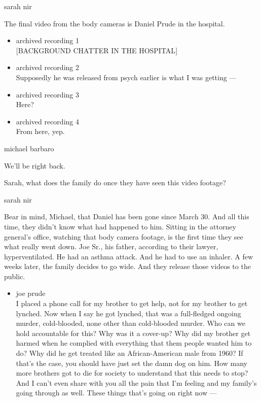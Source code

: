sarah nir

The final video from the body cameras is Daniel Prude in the hospital.

\begin{itemize}
\item
  archived recording 1\\
  {[}BACKGROUND CHATTER IN THE HOSPITAL{]}
\item
  archived recording 2\\
  Supposedly he was released from psych earlier is what I was getting
  ---
\item
  archived recording 3\\
  Here?
\item
  archived recording 4\\
  From here, yep.
\end{itemize}

michael barbaro

We'll be right back.

Sarah, what does the family do once they have seen this video footage?

sarah nir

Bear in mind, Michael, that Daniel has been gone since March 30. And all
this time, they didn't know what had happened to him. Sitting in the
attorney general's office, watching that body camera footage, is the
first time they see what really went down. Joe Sr., his father,
according to their lawyer, hyperventilated. He had an asthma attack. And
he had to use an inhaler. A few weeks later, the family decides to go
wide. And they release those videos to the public.

\begin{itemize}
\tightlist
\item
  joe prude\\
  I placed a phone call for my brother to get help, not for my brother
  to get lynched. Now when I say he got lynched, that was a full-fledged
  ongoing murder, cold-blooded, none other than cold-blooded murder. Who
  can we hold accountable for this? Why was it a cover-up? Why did my
  brother get harmed when he complied with everything that them people
  wanted him to do? Why did he get treated like an African-American male
  from 1960? If that's the case, you should have just set the damn dog
  on him. How many more brothers got to die for society to understand
  that this needs to stop? And I can't even share with you all the pain
  that I'm feeling and my family's going through as well. These things
  that's going on right now ---
\end{itemize}

